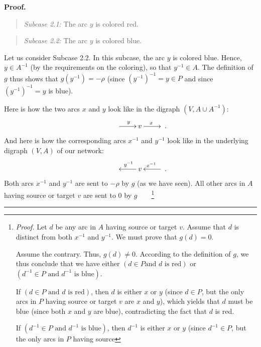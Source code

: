 \documentclass[numbers=enddot,12pt,final,onecolumn,notitlepage]{scrartcl}%
\theoremstyle{definition}
\newenvironment{statement}{\begin{quote}}{\end{quote}}
\newenvironment{proof}[1][Proof]{\noindent\textbf{#1.} }{\ \rule{0.5em}{0.5em}}
\begin{document}
\begin{proof}
\begin{statement}
\textit{Subcase 2.1:} The arc $y$ is colored red.
\end{statement}

\begin{statement}
\textit{Subcase 2.2:} The arc $y$ is colored blue.
\end{statement}

Let us consider Subcase 2.2. In this subcase, the arc $y$ is colored blue.
Hence, $y\in A^{-1}$ (by the requirements on the coloring), so that $y^{-1}\in
A$. The definition of $g$ thus shows that $g\left(  y^{-1}\right)  =-\rho$
(since $\left(  y^{-1}\right)  ^{-1}=y\in P$ and since $\left(  y^{-1}\right)
^{-1}=y$ is blue).

Here is how the two arcs $x$ and $y$ look like in the digraph $\left(  V,A\cup
A^{-1}\right)  $:%
\[%
\xymatrix{
& \ar[r]^y & v \ar[r]^x &
}%
.
\]
And here is how the corresponding arcs $x^{-1}$ and $y^{-1}$ look like in the
underlying digraph $\left(  V,A\right)  $ of our network:%
\begin{equation}%
\xymatrix{
& & v \ar[l]_{y^{-1}} & \ar[l]_{x^{-1}}
}%
. \label{pf.lem.6.a.sc2.2.3}%
\end{equation}
Both arcs $x^{-1}$ and $y^{-1}$ are sent to $-\rho$ by $g$ (as we have seen).
All other arcs in $A$ having source or target $v$ are sent to $0$ by
$g$\ \ \ \ \footnote{\textit{Proof.} Let $d$ be any arc in $A$ having source
or target $v$. Assume that $d$ is distinct from both $x^{-1}$ and $y^{-1}$. We
must prove that $g\left(  d\right)  =0$.
\par
Assume the contrary. Thus, $g\left(  d\right)  \neq0$. According to the
definition of $g$, we thus conclude that we have either $\left(  d\in P\text{
and }d\text{ is red}\right)  $ or $\left(  d^{-1}\in P\text{ and }d^{-1}
\text{ is blue}\right)  $.
\par
If $\left(  d\in P\text{ and }d\text{ is red}\right)  $, then $d$ is either
$x$ or $y$ (since $d\in P$, but the only arcs in $P$ having source or target
$v$ are $x$ and $y$), which yields that $d$ must be blue (since both $x$ and
$y$ are blue), contradicting the fact that $d$ is red.
\par
If $\left(  d^{-1}\in P\text{ and }d^{-1}\text{ is blue}\right)  $, then $d^{-1}$
is either $x$ or $y$ (since $d^{-1}\in P$, but the only arcs in $P$ having source
}
\end{proof}
\end{document}
